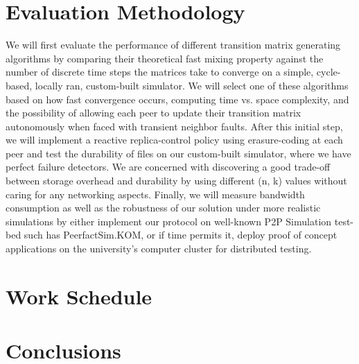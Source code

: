 \documentclass[runningheads]{llncs}
\begin{document}

\section{Evaluation Methodology}\label{sec:methodology}
We will first evaluate the performance of different transition matrix generating algorithms by comparing their theoretical fast mixing property against the number of discrete time steps the matrices take to converge on a simple, cycle-based, locally ran, custom-built simulator. We will select one of these algorithms based on how fast convergence occurs, computing time vs. space complexity, and the possibility of allowing each peer to update their transition matrix autonomously when faced with transient neighbor faults. After this initial step, we will implement a reactive replica-control policy using erasure-coding at each peer and test the durability of files on our custom-built simulator, where we have perfect failure detectors. We are concerned with discovering a good trade-off between storage overhead and durability by using different (n, k) values without caring for any networking aspects. Finally, we will measure bandwidth consumption as well as the robustness of our solution under more realistic simulations by either implement our protocol on well-known P2P Simulation test-bed such has PeerfactSim.KOM\cite{peerfact}, or if time permits it, deploy proof of concept applications on the university's computer cluster for distributed testing.


\newpage\section{Work Schedule}\label{sec:workschedule}

\section{Conclusions}\label{sec:conclusion}



\end{document}
